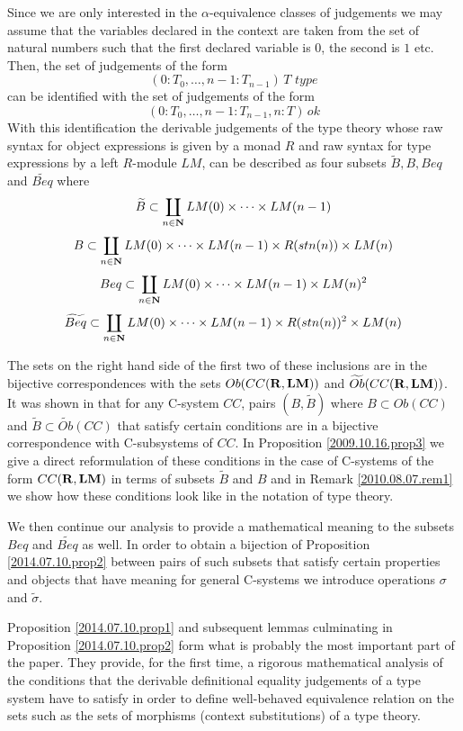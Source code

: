 \documentclass[11pt]{article}
\newcommand{\nn}{{\bf N\rm}}
\newcommand{\nat}{\nn}
\newcommand{\rr}{{\bf R}}
\newcommand{\lm}{{\bf LM}}
\newcommand{\wt}{\widetilde}
\begin{document}
Since we are only interested in the $\alpha$-equivalence classes of judgements we may assume that the variables declared in the context are taken from the set of natural numbers such that the first declared variable is $0$, the second is $1$ etc.  Then, the set of judgements of the form 
%
$$(0:T_0,\dots,{n-1}:T_{n-1})\,T\,\,type$$
%
can be identified with the set of judgements of the form 
%
$$(0:T_0,\dots,{n-1}:T_{n-1}, n:T)\,ok$$
%
With this identification the derivable judgements of the type theory whose raw syntax for object expressions is given by a monad $R$ and raw syntax for type expressions by a left $R$-module $LM$, can be described as four subsets ${\wt{B}},{B},{Beq}$ and ${\wt{Beq}}$ where 
%
$${\wt{B}} \subset \coprod_{n\in\nat} LM(0)\times\dots\times LM(n-1)$$
$${B}\subset  \coprod_{n\in\nat} LM(0)\times\dots\times LM(n-1)\times R({stn(n)})\times LM(n)$$
$${Beq} \subset \coprod_{n\in\nat} LM(0)\times\dots\times LM(n-1)\times LM(n)^2$$
$${\wt{Beq}} \subset \coprod_{n\in\nat} LM(0)\times\dots\times LM(n-1)\times R({stn(n)})^2\times LM(n)$$ 
%

The sets on the right hand side of the first two of these inclusions are in the bijective correspondences with the sets $Ob(CC(\rr,\lm))$ and $\wt{Ob}(CC(\rr,\lm))$. It was shown in \cite[Proposition 4.3]{Csubsystems} that for any C-system $CC$, pairs $(B,\wt{B})$ where $B\subset Ob(CC)$ and $\wt{B}\subset \wt{Ob}(CC)$ that satisfy certain conditions are in a bijective correspondence with C-subsystems of $CC$. In Proposition \ref{2009.10.16.prop3} we give a direct reformulation of these conditions in the case of C-systems of the form $CC(\rr,\lm)$ in terms of subsets ${\wt{B}}$ and ${B}$ and in Remark \ref{2010.08.07.rem1} we show how these conditions look like in the notation of type theory. 

We then continue our analysis to provide a mathematical meaning to the subsets ${Beq}$ and ${\wt{Beq}}$ as well. In order to obtain a bijection of Proposition \ref{2014.07.10.prop2} between pairs of such subsets that satisfy certain properties and objects that have meaning for general C-systems we introduce operations $\sigma$ and $\wt{\sigma}$. 

Proposition \ref{2014.07.10.prop1} and subsequent lemmas culminating in Proposition \ref{2014.07.10.prop2} form what is probably the most important part of the paper. They provide, for the first time, a rigorous mathematical analysis of the conditions that the derivable definitional equality judgements of a type system have to satisfy in order to define well-behaved equivalence relation on the sets such as the sets of morphisms (context substitutions) of a type theory. 
\end{document}
